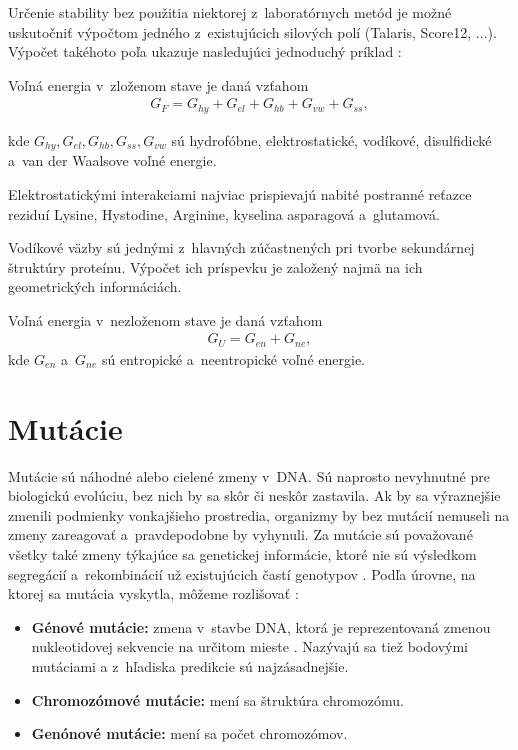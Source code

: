 Určenie stability bez použitia niektorej z~laboratórnych metód je možné uskutočniť výpočtom jedného z~existujúcich silových polí (Talaris, Score12, ...). Výpočet takéhoto poľa ukazuje nasledujúci jednoduchý príklad \cite{free_energy} \cite{gromiha}:

Voľná energia v~zloženom stave je daná vzťahom  
	\begin{align}
		G_{F} = G_{hy} + G_{el} + G_{hb} + G_{vw} + G_{ss},
	\end{align}

kde $G_{hy}, G_{el}, G_{hb}, G_{ss}, G_{vw}$ sú hydrofóbne, elektrostatické, vodíkové, disulfidické a~van der Waalsove voľné energie. 


Elektrostatickými interakciami najviac prispievajú nabité postranné reťazce reziduí Lysine, Hystodine, Arginine, kyselina asparagová a~glutamová.

Vodíkové väzby sú jednými z~hlavných zúčastnených pri tvorbe sekundárnej štruktúry proteínu. Výpočet ich príspevku je založený najmä na ich geometrických informáciách.

Voľná energia v~nezloženom stave je daná vzťahom
\begin{align}
	G_U = G_{en} + G_{ne},
\end{align}
kde $G_{en}$ a~$G_{ne}$ sú entropické a~neentropické voľné energie.


\section{Mutácie}
Mutácie sú náhodné alebo cielené zmeny v~DNA. Sú naprosto nevyhnutné pre biologickú evolúciu, bez nich by sa skôr či neskôr zastavila. Ak by sa výraznejšie zmenili podmienky vonkajšieho prostredia, organizmy by bez mutácií nemuseli na zmeny zareagovať a~pravdepodobne by vyhynuli. Za mutácie sú považované všetky také zmeny týkajúce sa genetickej informácie, ktoré nie sú výsledkom segregácií a~rekombinácií už existujúcich častí genotypov \cite{mutace}. 
Podľa úrovne, na ktorej sa mutácia vyskytla, môžeme rozlišovať \cite{flegr}:
\begin{itemize}
	\item \textbf{Génové mutácie:} zmena v~stavbe DNA, ktorá je reprezentovaná zmenou nukleotidovej sekvencie na určitom mieste \cite{mutace}. Nazývajú sa tiež bodovými mutáciami a z~hľadiska predikcie sú najzásadnejšie.
	\item \textbf{Chromozómové mutácie:} mení sa štruktúra chromozómu.
	\item \textbf{Genónové mutácie:} mení sa počet chromozómov.
\end{itemize}


